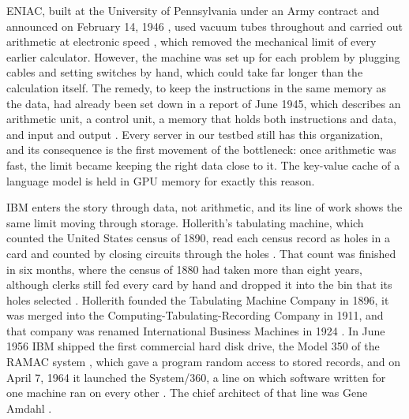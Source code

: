ENIAC, built at the University of Pennsylvania under an Army contract and
announced on February 14, 1946 \citep{penn_eniac}, used vacuum tubes throughout and
carried out arithmetic at electronic speed \citep{goldstine1946eniac}, which
removed the mechanical limit of every earlier calculator. However, the machine was set up for each problem by
plugging cables and setting switches by hand, which could take far longer
than the calculation itself. The remedy, to keep the instructions in the
same memory as the data, had already been set down in a report of June 1945,
which describes an arithmetic unit, a control unit, a memory that holds both instructions and
data, and input and output \citep{vonneumann1945}. Every server in our
testbed still has this organization, and its consequence is the first
movement of the bottleneck: once arithmetic was fast, the limit became
keeping the right data close to it. The key-value cache of a language model
is held in GPU memory for exactly this reason.

IBM enters the story through data, not arithmetic, and its line of work
shows the same limit moving through storage. Hollerith's tabulating machine,
which counted the United States census of 1890, read each census record as
holes in a card and counted by closing circuits through the holes
\citep{hollerith1894}. That count was finished in six months, where the
census of 1880 had taken more than eight years, although clerks still fed
every card by hand and dropped it into the bin that its holes selected
\citep{ibm_tabulator}. Hollerith founded the Tabulating Machine Company in
1896, it was merged into the Computing-Tabulating-Recording Company in 1911,
and that company was renamed International Business Machines in 1924
\citep{ibm_tabulator,goldstine1972}. In June 1956 IBM shipped the first
commercial hard disk drive, the Model 350 of the RAMAC system
\citep{chm_ramac}, which gave a program random access to stored records, and
on April 7, 1964 it launched the System/360, a line on which software
written for one machine ran on every other \citep{ibm_system360}. The chief
architect of that line was Gene Amdahl \citep{ibm_system360}.

